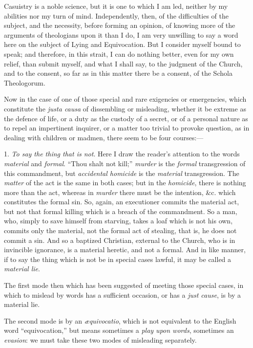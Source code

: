 Casuistry is a noble science, but it is one to which I am led,
neither by my abilities nor my turn of mind. Independently, then, of the
difficulties of the subject, and the necessity, before forming an
opinion, of knowing more of the arguments of theologians upon it than I
do, I am very unwilling to say a word here on the subject of Lying and
Equivocation. But I consider myself bound to speak; and therefore, in
this strait, I can do nothing better, even for my own relief, than
submit myself, and what I shall say, to the judgment of the Church, and to
the consent, so far as in this matter there be a consent, of the Schola
Theologorum.

Now in the case of one of those special and rare exigencies or
emergencies, which constitute the \emph{justa causa} of dissembling or
misleading, whether it be extreme as the defence of life, or a duty as
the custody of a secret, or of a personal nature as to repel an
impertinent inquirer, or a matter too trivial to provoke question, as in
dealing with children or madmen, there seem to be four courses:—

1. \emph{To say the thing that is not}. Here I draw the reader's
attention to the words \emph{material} and \emph{formal}. ``Thou
shalt not kill;'' \emph{murder} is the \emph{formal} transgression
of this commandment, but \emph{accidental homicide} is the \emph{material}
transgression. The \emph{matter} of the act is the same in both cases;
but in the \emph{homicide}, there is nothing more than the act, whereas
in \emph{murder} there must be the intention, \&c. which constitutes
the formal sin. So, again, an executioner commits the material act, but
not that formal killing which is a breach of the commandment. So a man,
who, simply to save himself from starving, takes a loaf which is not his
own, commits only the material, not the formal act of stealing, that is,
he does not commit a sin. And so a baptized Christian, external to the
Church, who is in invincible ignorance, is a material heretic, and not a
formal. And in like manner, if to say the thing which is not be in
special cases lawful, it may be called a \emph{material lie}.

The first mode then which has been suggested of meeting those special
cases, in which to mislead by words has a sufficient occasion,
or has a \emph{just cause}, is by a material lie.

The second mode is by an \emph{æquivocatio}, which is not equivalent
to the English word ``equivocation,'' but means sometimes a \emph{play
upon words}, sometimes an \emph{evasion}: we must take these two
modes of misleading separately.

